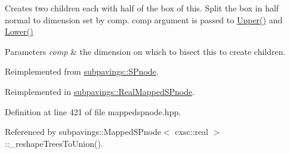 \-Creates two children each with half of the box of this. \-Split the box in half normal to dimension set by comp. comp argument is passed to \hyperlink{toolz_8cpp_acb5cc90c84a0b29fbbf2bed1f4ece8d3}{\-Upper()} and \hyperlink{toolz_8cpp_ae667f0f5dcaff56bf979f20da13e9c9f}{\-Lower()}


\begin{DoxyParams}{\-Parameters}
{\em comp} & the dimension on which to bisect this to create children. \\
\hline
\end{DoxyParams}


\-Reimplemented from \hyperlink{classsubpavings_1_1SPnode_ac27ee8ea1399ed0121ed970c8fd51543}{subpavings\-::\-S\-Pnode}.



\-Reimplemented in \hyperlink{classsubpavings_1_1RealMappedSPnode_a4d0129dda149a950a06e9d2e3ff802c4}{subpavings\-::\-Real\-Mapped\-S\-Pnode}.



\-Definition at line 421 of file mappedspnode.\-hpp.



\-Referenced by subpavings\-::\-Mapped\-S\-Pnode$<$ cxsc\-::real $>$\-::\-\_\-reshape\-Trees\-To\-Union().


